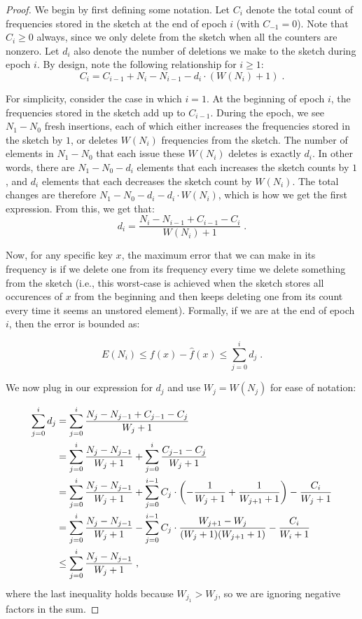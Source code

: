 \documentclass[sigconf]{acmart}
\begin{document}
\begin{proof}
We begin by first defining some notation. Let $C_i$ denote the total count of frequencies stored in the sketch at the end of epoch $i$ (with $C_{-1}=0$). Note that $C_i \geq 0$ always, since we only delete from the sketch when all the counters are nonzero. Let $d_i$ also denote the number of deletions we make to the sketch during epoch $i$. By design, note the following relationship for $i\geq 1$:
$$ C_i = C_{i-1} + N_i - N_{i-1} - d_i \cdot (W(N_i)+1) \;.$$

For simplicity, consider the case in which $i=1$. At the beginning of epoch $i$, the frequencies stored in the sketch add up to $C_{i-1}$. During the epoch, we see $N_1-N_0$ fresh insertions, each of which either increases the frequencies stored in the sketch by $1$, or deletes $W(N_i)$ frequencies from the sketch. The number of elements in $N_1-N_0$ that each issue these $W(N_i)$ deletes is exactly $d_i$. In other words, there are $N_1-N_0-d_i$ elements that each increases the sketch counts by $1$, and $d_i$ elements that each decreases the sketch count by $W(N_i)$. The total changes are therefore $N_1-N_0-d_i - d_i \cdot W(N_i)$, which is how we get the first expression. From this, we get that:
$$d_i = \frac{N_i - N_{i-1} + C_{i-1}-C_i}{W(N_i)+1} \;.$$

Now, for any specific key $x$, the maximum error that we can make in its frequency is if we delete one from its frequency every time we delete something from the sketch (i.e., this worst-case is achieved when the sketch stores all occurences of $x$ from the beginning and then keeps deleting one from its count every time it seems an unstored element). Formally, if we are at the end of epoch $i$, then the error is bounded as:

$$ E(N_i) \leq f(x)  -  \hat{f}(x) \leq \sum_{j=0}^i d_j \;.$$


\noindent
We now plug in our expression for $d_j$ and  use $W_j=W(N_j)$ for ease of notation: 

\begin{align*}
\sum_{j=0}^i d_j  &= \sum_{j=0}^i  \frac{N_j - N_{j-1} + C_{j-1}-C_j}{W_j+1} \\
&= \sum_{j=0}^i  \frac{N_j - N_{j-1}}{W_j+1} + \sum_{j=0}^i \frac{C_{j-1}-C_j}{W_j+1} \\
&=\sum_{j=0}^i  \frac{N_j - N_{j-1}}{W_j+1} + \sum_{j=0}^{i-1} C_j \cdot \left(-\frac{1}{W_j+1}+\frac{1}{W_{j+1}+1}\right) - \frac{C_i}{W_j+1}\\
&=\sum_{j=0}^i  \frac{N_j - N_{j-1}}{W_j+1} - \sum_{j=0}^{i-1} C_j \cdot \frac{W_{j+1} - W_j}{(W_j+1)(W_{j+1}+1)} - \frac{C_i}{W_i+1}\\
&\leq \sum_{j=0}^i  \frac{N_j - N_{j-1}}{W_j+1}  \;,
\end{align*}
where the last inequality holds because $W_{j_1}>W_j$, so we are ignoring negative factors in the sum.
\end{proof}
\end{document}
